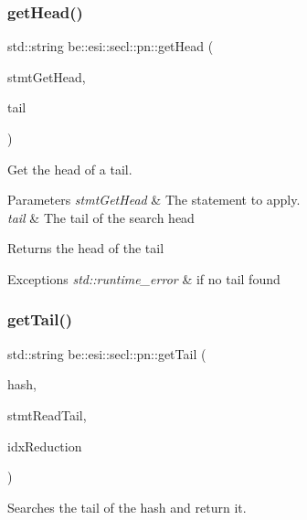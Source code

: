 \subsubsection{\texorpdfstring{get\+Head()}{getHead()}}
{\footnotesize\ttfamily std\+::string be\+::esi\+::secl\+::pn\+::get\+Head (\begin{DoxyParamCaption}\item[{sqlite3\+\_\+stmt $\ast$}]{stmt\+Get\+Head,  }\item[{std\+::string}]{tail }\end{DoxyParamCaption})}



Get the head of a tail. 


\begin{DoxyParams}{Parameters}
{\em stmt\+Get\+Head} & The statement to apply. \\
\hline
{\em tail} & The tail of the search head \\
\hline
\end{DoxyParams}
\begin{DoxyReturn}{Returns}
the head of the tail 
\end{DoxyReturn}

\begin{DoxyExceptions}{Exceptions}
{\em std\+::runtime\+\_\+error} & if no tail found \\
\hline
\end{DoxyExceptions}
\mbox{\label{namespacebe_1_1esi_1_1secl_1_1pn_a44dea6059d3689561497f5f03e09dac2}} 
\subsubsection{\texorpdfstring{get\+Tail()}{getTail()}}
{\footnotesize\ttfamily std\+::string be\+::esi\+::secl\+::pn\+::get\+Tail (\begin{DoxyParamCaption}\item[{const std\+::string \&}]{hash,  }\item[{sqlite3\+\_\+stmt $\ast$}]{stmt\+Read\+Tail,  }\item[{int \&}]{idx\+Reduction }\end{DoxyParamCaption})}



Searches the tail of the hash and return it. 

